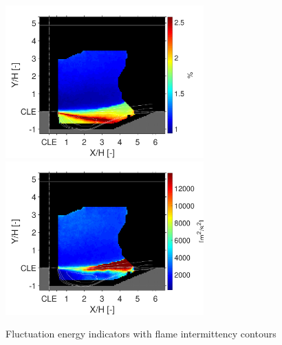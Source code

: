 \begin{figure}
\centering
{}
        {\includegraphics[width=3in, trim=0.3in 0in 0.1in 0.1in, clip]{figures/B1/whole_statistics/B1_TI}}
        \hspace{0.2in}
{\includegraphics[width=3in,trim=0 0 1.3cm 0, clip]{figures/B1/whole_statistics/B1_TKE}
}
\caption{Fluctuation energy indicators with flame intermittency contours}\label{fig:ch3_UxTKETI_PIVPLIF}
\end{figure}

